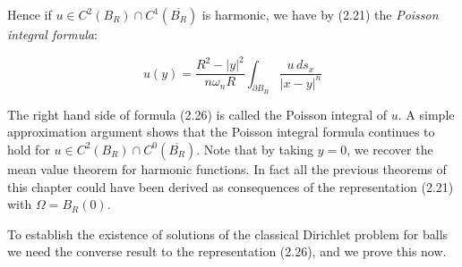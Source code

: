 Hence if $u \in C^2(B_R)\cap C^1(\overline{B_R})$ is harmonic, we have by (2.21) the \textit{Poisson integral formula}:

\begin{equation}
u(y)=\frac{R^2-|y|^2}{n\omega_n R}\int_{\partial B_R}\frac{u\,d s_x}{|x-y|^n}
\tag{2.26}
\end{equation}

The right hand side of formula (2.26) is called the Poisson integral of $u$. A simple approximation argument shows that the Poisson integral formula continues to hold for $u \in C^2(B_R)\cap C^0(\overline{B_R})$. Note that by taking $y=0$, we recover the mean value theorem for harmonic functions. In fact all the previous theorems of this chapter could have been derived as consequences of the representation (2.21) with $\Omega = B_R(0)$.

To establish the existence of solutions of the classical Dirichlet problem for balls we need the converse result to the representation (2.26), and we prove this now.

